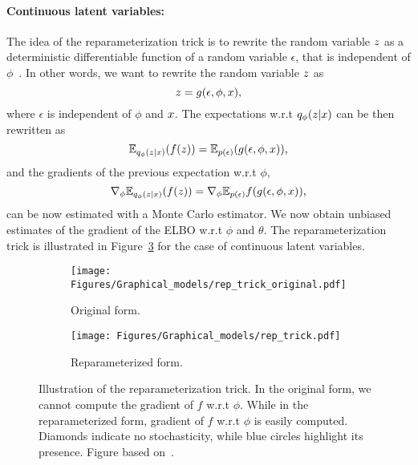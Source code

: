 \paragraph{Continuous latent variables: }
\label{subsec:reparameterization_trick}
The idea of the reparameterization trick 
is to rewrite the random variable $z$
as a deterministic differentiable function of a random variable $\epsilon$,
that is independent of $\phi$~\citep{kingma2014}.
In other words, we want to rewrite the random variable $z$ as
\begin{equation}
    \label{eq:reparameterization_trick}
    z = g(\epsilon, \phi, x) \text{,}
\end{equation}
where $\epsilon$ is independent of $\phi$ and $x$.
The expectations w.r.t $q_\phi(z|x)$ can be then rewritten as
\begin{equation*}
    \label{eq:expectation_reparameterization}
    {\mathbb{E}}_{q_\phi(z|x)}( f(z) ) = 
    {\mathbb{E}}_{p(\epsilon)} (g(\epsilon, \phi, x))\text{,}
\end{equation*}
and the gradients of the previous expectation w.r.t $\phi$, 
$$\nabla_{\phi} {\mathbb{E}}_{q_\phi(z|x)}( f(z) ) =  \nabla_{\phi}
{\mathbb{E}}_{p(\epsilon)} f(g(\epsilon, \phi, x))\text{,}$$
can be now estimated with a Monte Carlo estimator. 
We now obtain unbiased estimates of the gradient of the ELBO w.r.t $\phi$ and $\theta$.
The reparameterization trick is illustrated in 
Figure~\ref{fig:rep_trick_cont}
for the case of continuous latent variables.

\begin{figure}[htb]
\begin{subfigure}[b]{0.4\linewidth}
        \centering
        \texttt{[image: Figures/Graphical\_models/rep\_trick\_original.pdf]}
        \caption{Original form.}
        \label{fig:rt_original}
\end{subfigure}
\begin{subfigure}[b]{0.5\linewidth}
        \centering
        \texttt{[image: Figures/Graphical\_models/rep\_trick.pdf]}
        \caption{Reparameterized form.}
        \label{fig:rt}
\end{subfigure}
\caption{Illustration of the reparameterization trick.
In the original form, we cannot compute the gradient of $f$ w.r.t $\phi$. While
in the reparameterized form, gradient of $f$ w.r.t $\phi$ is easily computed.
Diamonds indicate no stochasticity, while blue circles highlight its presence.
Figure based on~\citep{kingma2014}.}
\label{fig:rep_trick_cont}
\end{figure} 


